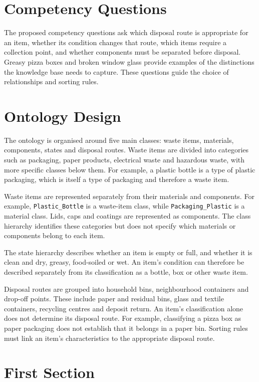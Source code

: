 \documentclass[runningheads]{llncs}
\begin{document}
\section{Competency Questions}
The proposed competency questions ask which disposal route is appropriate for
an item, whether its condition changes that route, which items require a
collection point, and whether components must be separated before disposal.
Greasy pizza boxes and broken window glass provide examples of the
distinctions the knowledge base needs to capture. These questions guide the
choice of relationships and sorting rules.

\section{Ontology Design}
The ontology is organised around five main classes: waste items, materials,
components, states and disposal routes. Waste items are divided into categories
such as packaging, paper products, electrical waste and hazardous waste, with
more specific classes below them. For example, a plastic bottle is a type of
plastic packaging, which is itself a type of packaging and therefore a waste
item.

Waste items are represented separately from their materials and components.
For example, \texttt{Plastic\_\allowbreak Bottle} is a waste-item class, while
\texttt{Packaging\_Plastic} is a material class. Lids, caps and coatings are
represented as components. The class hierarchy identifies these categories but
does not specify which materials or components belong to each item.

The state hierarchy describes whether an item is empty or full, and whether it
is clean and dry, greasy, food-soiled or wet. An item's condition can therefore
be described separately from its classification as a bottle, box or other
waste item.

Disposal routes are grouped into household bins, neighbourhood containers and
drop-off points. These include paper and residual bins, glass and textile
containers, recycling centres and deposit return. An item's classification
alone does not determine its disposal route. For example, classifying a pizza
box as paper packaging does not establish that it belongs in a paper bin.
Sorting rules must link an item's characteristics to the appropriate disposal
route.

\section{First Section}
\end{document}
